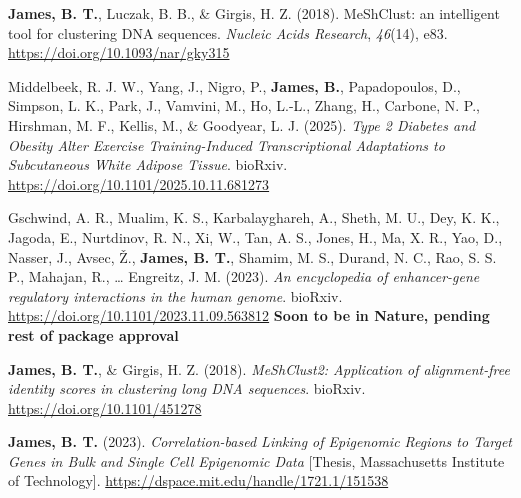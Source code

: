 \documentclass[letter,11pt]{article}
\let\HREF\href
\renewcommand{\href}[2]{\HREF{#1}{\begingroup\UrlFont #2\endgroup}}
\begin{document}
		\item[\textbf{[J.17]}]{\textbf{James, B. T.}, Luczak, B. B., \& Girgis, H. Z. (2018). MeShClust: an intelligent tool for clustering DNA sequences. \textit{Nucleic Acids Research}, \textit{46}(14), e83. \url{https://doi.org/10.1093/nar/gky315}}

		\item[\textbf{[P.18]}]{Middelbeek, R. J. W., Yang, J., Nigro, P., \textbf{James, B.}, Papadopoulos, D., Simpson, L. K., Park, J., Vamvini, M., Ho, L.-L., Zhang, H., Carbone, N. P., Hirshman, M. F., Kellis, M., \& Goodyear, L. J. (2025). \textit{Type 2 Diabetes and Obesity Alter Exercise Training-Induced Transcriptional Adaptations to Subcutaneous White Adipose Tissue}. bioRxiv. \url{https://doi.org/10.1101/2025.10.11.681273}}

		\item[\textbf{[P.19]}]{Gschwind, A. R., Mualim, K. S., Karbalayghareh, A., Sheth, M. U., Dey, K. K., Jagoda, E., Nurtdinov, R. N., Xi, W., Tan, A. S., Jones, H., Ma, X. R., Yao, D., Nasser, J., Avsec, Ž., \textbf{James, B. T.}, Shamim, M. S., Durand, N. C., Rao, S. S. P., Mahajan, R., … Engreitz, J. M. (2023). \textit{An encyclopedia of enhancer-gene regulatory interactions in the human genome}. bioRxiv. \url{https://doi.org/10.1101/2023.11.09.563812} \textbf{Soon to be in Nature, pending rest of package approval}}

		\item[\textbf{[P.20]}]{\textbf{James, B. T.}, \& Girgis, H. Z. (2018). \textit{MeShClust2: Application of alignment-free identity scores in clustering long DNA sequences}. bioRxiv. \url{https://doi.org/10.1101/451278}}

		\item[\textbf{[T.21]}]{\textbf{James, B. T.} (2023). \textit{Correlation-based Linking of Epigenomic Regions to Target Genes in Bulk and Single Cell Epigenomic Data} [Thesis, Massachusetts Institute of Technology]. \url{https://dspace.mit.edu/handle/1721.1/151538}}

\end{document}
